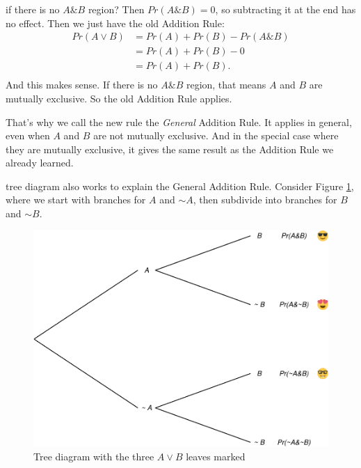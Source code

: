 \documentclass[justified]{tufte-book}
\renewcommand{\neg}{\mathbin{\sim}}
\renewcommand{\wedge}{\mathbin{\&}}
\newcommand{\p}{Pr}
\theoremstyle{definition}
\theoremstyle{definition}
\theoremstyle{definition}
\theoremstyle{remark}
\begin{document}
 if there is no \(A \wedge B\) region? Then \(\p(A \wedge B) = 0\), so subtracting it at the end has no effect. Then we just have the old Addition Rule:
\[
  \begin{aligned}
    \p(A \vee B) &= \p(A) + \p(B) - \p(A \wedge B)\\
                 &= \p(A) + \p(B) - 0\\
                 &= \p(A) + \p(B).\\
  \end{aligned}
\]
And this makes sense. If there is no \(A \wedge B\) region, that means \(A\) and \(B\) are mutually exclusive. So the old Addition Rule applies.

That's why we call the new rule the \emph{General} Addition Rule. It applies in general, even when \(A\) and \(B\) are not mutually exclusive. And in the special case where they are mutually exclusive, it gives the same result as the Addition Rule we already learned.

 tree diagram also works to explain the General Addition Rule. Consider Figure \ref{fig:gatree}, where we start with branches for \(A\) and \(\neg A\), then subdivide into branches for \(B\) and \(\neg B\).

\begin{figure}
\includegraphics{_main_files/figure-latex/gatree-1} \caption[Tree diagram with the three $A \vee B$ leaves marked]{Tree diagram with the three $A \vee B$ leaves marked}\label{fig:gatree}
\end{figure}
\end{document}
